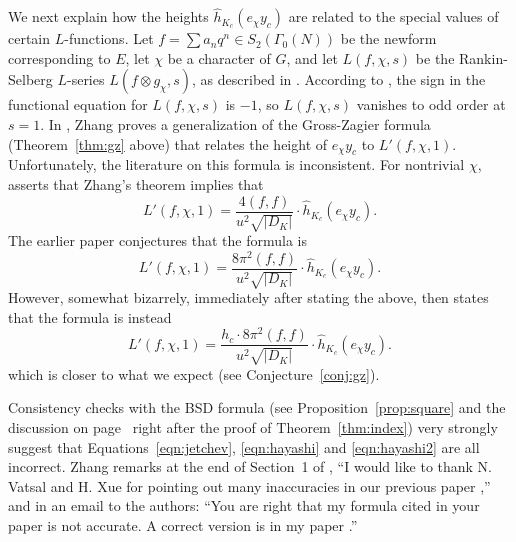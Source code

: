 \documentclass[preprint,12pt]{elsarticle}
\newcommand{\hhat}{\hat{h}}
\theoremstyle{plain}
\theoremstyle{definition}
\begin{document}
We next explain how the heights $\hhat_{K_c}(e_\chi y_c)$ are related to the special values of
certain $L$-functions.
Let $f =\sum a_n q^n \in S_2(\Gamma_0(N))$ be the newform corresponding to $E$, let $\chi$ be a character
of $G$, and let $L(f,\chi,s)$ be the Rankin-Selberg $L$-series $L(f
\otimes g_\chi, s)$, as described in \cite[\S{}III]{gross:heegnerX0N}.
According to \cite[Prop.~21.2]{gross:heegnerX0N}, the sign in the
functional equation for $L(f, \chi, s)$ is $-1$, so $L(f,\chi,s)$
vanishes to odd order at $s=1$.
In \cite[Thm.~1.2.1]{zhang:gz_formulas}, Zhang proves a generalization
of the Gross-Zagier formula (Theorem~\ref{thm:gz} above)
that relates the height of $e_\chi y_c$ to
$L'(f, \chi, 1)$.  
Unfortunately, the literature on this formula is inconsistent.
For nontrivial $\chi$, \cite[\S A.2]{jetchev-lauter-stein} 
asserts that Zhang's theorem implies that
\begin{equation}\label{eqn:jetchev}
L'(f, \chi, 1) = \frac{4(f,f)}{u^2 \sqrt{|D_K|}}\cdot \hhat_{K_c}(e_\chi y_c).
\end{equation}
The earlier paper \cite[Thm.~2]{hayashi:gz} conjectures that the
formula is
\begin{equation}\label{eqn:hayashi}
L'(f, \chi, 1) = \frac{8\pi^2(f,f)}{u^2 \sqrt{|D_K|}} \cdot  \hhat_{K_c}(e_\chi y_c).
\end{equation}
However, somewhat bizarrely, immediately after stating the above, \cite{hayashi:gz}
then states that the formula is instead
\begin{equation}\label{eqn:hayashi2}
L'(f, \chi, 1) = \frac{h_c \cdot 8\pi^2(f,f)}{u^2 \sqrt{|D_K|}} \cdot  \hhat_{K_c}(e_\chi y_c).
\end{equation}
which is closer to what we expect (see Conjecture~\ref{conj:gz}).

Consistency checks with the BSD formula (see
Proposition~\ref{prop:square} and the discussion on
page~\pageref{nocond} right after the proof of
Theorem~\ref{thm:index}) very strongly suggest that
Equations~\eqref{eqn:jetchev}, \eqref{eqn:hayashi} and
\eqref{eqn:hayashi2} are all incorrect.  Zhang remarks at the end of
Section~1 of \cite{zhang:gzgl2}, ``I would like to thank N. Vatsal and
H. Xue for pointing out many inaccuracies in our previous paper
\cite{zhang:gz_formulas},'' and in an email to the authors: ``You are
right that my formula cited in your paper is not accurate.  A correct
version is in my paper \cite{zhang:gzgl2}.''  
\end{document}
